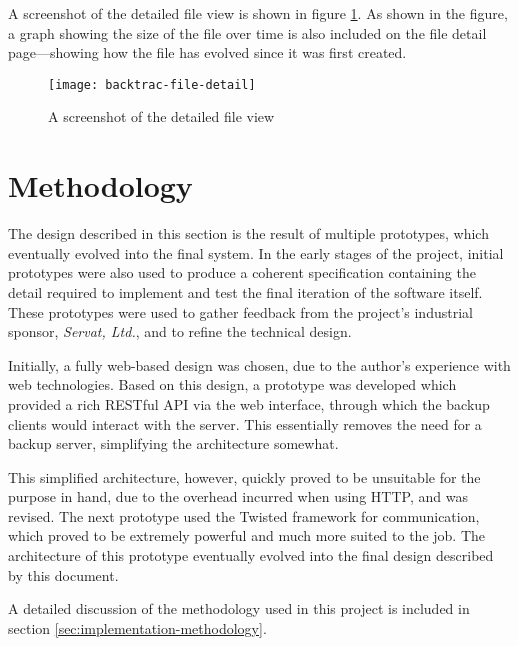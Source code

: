 A screenshot of the detailed file view is shown in figure
\ref{fig:backtrac-file-detail}. As shown in the figure, a graph showing the
size of the file over time is also included on the file detail page---showing
how the file has evolved since it was first created.

\begin{figure}[h]
    \begin{center}
        \texttt{[image: backtrac-file-detail]}
    \end{center}
    \caption{A screenshot of the detailed file view}
    \label{fig:backtrac-file-detail}
\end{figure}

\section{Methodology}

The design described in this section is the result of multiple prototypes,
which eventually evolved into the final system. In the early stages of the
project, initial prototypes were also used to produce a coherent specification
containing the detail required to implement and test the final iteration of the
software itself. These prototypes were used to gather feedback from the
project's industrial sponsor, \emph{Servat, Ltd.}, and to refine the technical
design.

Initially, a fully web-based design was chosen, due to the author's experience
with web technologies. Based on this design, a prototype was developed which
provided a rich RESTful API via the web interface, through which the backup
clients would interact with the server. This essentially removes the need for
a backup server, simplifying the architecture somewhat.

This simplified architecture, however, quickly proved to be unsuitable for the
purpose in hand, due to the overhead incurred when using HTTP, and was revised.
The next prototype used the Twisted framework for communication, which proved
to be extremely powerful and much more suited to the job. The architecture of
this prototype eventually evolved into the final design described by this
document.

A detailed discussion of the methodology used in this project is included in
section \ref{sec:implementation-methodology}.
